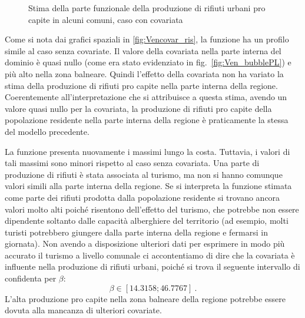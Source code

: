 \documentclass[a4paper,11pt,twoside,openright]{book}							%
\begin{document}
\begin{figure}[t]
{   }
	\caption{Stima della parte funzionale della produzione di rifiuti urbani pro capite in alcuni comuni, caso con covariata}
	\label{fig:Vencovar_tempo}
\end{figure}
\newpage
Come si nota dai grafici spaziali in \ref{fig:Vencovar_ris}, la funzione ha un profilo simile al caso senza covariate. Il valore della covariata nella parte interna del dominio è quasi nullo (come era stato evidenziato in fig.~\ref{fig:Ven_bubblePL}) e più alto nella zona balneare. Quindi l'effetto della covariata non ha variato la stima della produzione di rifiuti pro capite nella parte interna della regione. Coerentemente all'interpretazione che si attribuisce a questa stima, avendo un valore quasi nullo per la covariata, la produzione di rifiuti pro capite della popolazione residente nella parte interna della regione è praticamente la stessa del modello precedente.

La funzione presenta nuovamente i massimi lungo la costa. Tuttavia, i valori di tali massimi sono minori rispetto al caso senza covariata. Una parte di produzione di rifiuti è stata associata al turismo, ma non si hanno comunque valori simili alla parte interna della regione. Se si interpreta la funzione stimata come parte dei rifiuti prodotta dalla popolazione residente si trovano ancora valori molto alti poiché risentono dell'effetto del turismo, che potrebbe non essere dipendente soltanto dalle capacità alberghiere del territorio (ad esempio, molti turisti potrebbero giungere dalla parte interna della regione e fermarsi in giornata). Non avendo a disposizione ulteriori dati per esprimere in modo più accurato il turismo a livello comunale ci accontentiamo di dire che la covariata è influente nella produzione di rifiuti urbani, poiché si trova il seguente intervallo di confidenta per $\beta$:
$$
\beta \in [14.3158;46.7767] \ .
$$
L'alta produzione pro capite nella zona balneare della regione potrebbe essere dovuta alla mancanza di ulteriori covariate.
\end{document}

